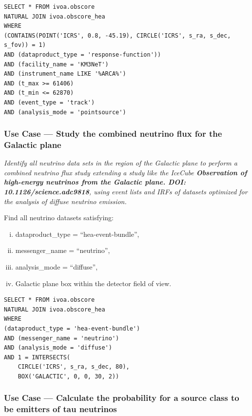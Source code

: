 \begin{verbatim}
SELECT * FROM ivoa.obscore
NATURAL JOIN ivoa.obscore_hea
WHERE
(CONTAINS(POINT('ICRS', 0.8, -45.19), CIRCLE('ICRS', s_ra, s_dec, s_fov)) = 1)
AND (dataproduct_type = 'response-function'))
AND (facility_name = 'KM3NeT')
AND (instrument_name LIKE '%ARCA%')
AND (t_max >= 61406)
AND (t_min <= 62870)
AND (event_type = 'track')
AND (analysis_mode = 'pointsource')
\end{verbatim}


\subsubsection{Use Case --- Study the combined neutrino flux for the Galactic plane}

{\em Identify all neutrino data sets in the region of the Galactic plane to perform a combined neutrino flux study extending a study like the IceCube \textbf{Observation of high-energy neutrinos from the Galactic plane. DOI: 10.1126/science.adc9818}, using event lists and IRFs of datasets optimized for the analysis of diffuse neutrino emission.}

\medskip
\noindent Find all neutrino datasets satisfying:
\begin{enumerate}[(i)]
  \item dataproduct\_type = ``hea-event-bundle'',
  \item messenger\_name = ``neutrino'',
  \item analysis\_mode = ``diffuse'',
  \item Galactic plane box within the detector field of view.
\end{enumerate}

\begin{verbatim}
SELECT * FROM ivoa.obscore
NATURAL JOIN ivoa.obscore_hea
WHERE
(dataproduct_type = 'hea-event-bundle')
AND (messenger_name = 'neutrino')
AND (analysis_mode = 'diffuse')
AND 1 = INTERSECTS(
    CIRCLE('ICRS', s_ra, s_dec, 80),
    BOX('GALACTIC', 0, 0, 30, 2))
\end{verbatim}

\subsubsection{Use Case --- Calculate the probability for a source class to be emitters of tau neutrinos}

